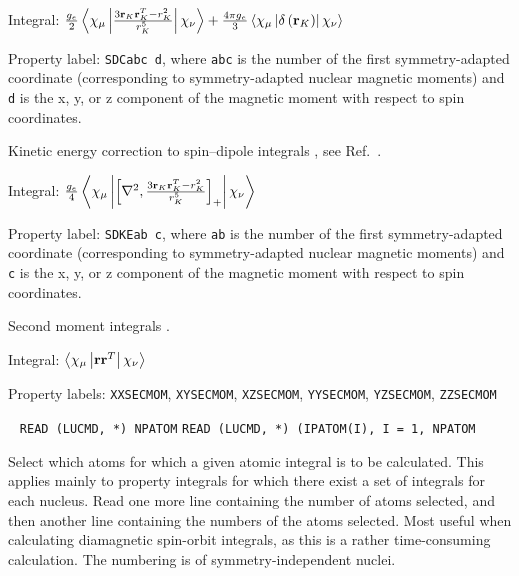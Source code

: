 \begin{description}
\begin{list}{}{}
\item Integral: $\frac{g_e}{2}\left<\chi_{\mu}\left|\frac{3{\bf
r}_K{\bf r}_K^T - r_K^2}{r_{K}^5}\right|\chi_{\nu}\right> + \frac{4\pi
g_e}{3}\left<\chi_{\mu}\left|\delta\left({\bf
r}_K\right)\right|\chi_{\nu}\right>$
\item Property label: \verb|SDCabc d|, where \verb|abc| is the number
of the first symmetry-adapted coordinate (corresponding to
symmetry-adapted nuclear magnetic moments) and \verb|d| is the x, y,
or z component of the magnetic moment with respect to spin coordinates.
\end{list}

\item[\Key{SD-KE}] Kinetic energy correction to spin--dipole integrals
,
see Ref.~\cite{pmpljvkrjcp119}.

\begin{list}{}{}
\item Integral: $\frac{g_e}{4}\left<\chi_{\mu}\left|\left[\nabla^2,\frac{3{\bf
r}_K{\bf r}_K^T - r_K^2}{r_{K}^5}\right]_+\right|\chi_{\nu}\right>$
\item Property label: \verb|SDKEab c|, where \verb|ab| is the number
of the first symmetry-adapted coordinate (corresponding to
symmetry-adapted nuclear magnetic moments) and \verb|c| is the x, y,
or z component of the magnetic moment with respect to spin coordinates.
\end{list}

\item[\Key{SECMOM}] Second moment integrals
.

\begin{list}{}{}
\item Integral: $\left<\chi_{\mu}\left|{\bf r}{\bf
r}^{T}\right|\chi_{\nu}\right>$
\item Property labels: \verb|XXSECMOM|, \verb|XYSECMOM|,
\verb|XZSECMOM|, \verb|YYSECMOM|, \verb|YZSECMOM|, \verb|ZZSECMOM|
\end{list}

\item[\Key{SELECT}]\verb| |\newline
\verb|READ (LUCMD, *) NPATOM|\newline
\verb|READ (LUCMD, *) (IPATOM(I), I = 1, NPATOM|

Select which atoms for which a given atomic integral is to be
calculated. This applies mainly to property integrals for which
there exist a set of integrals for each nucleus. Read one more line
containing the number of atoms selected, and then another line
containing the numbers of the atoms selected. Most useful when
calculating diamagnetic spin-orbit
integrals, as this is a rather time-consuming calculation. The
numbering is of symmetry-independent nuclei.


\end{description}
